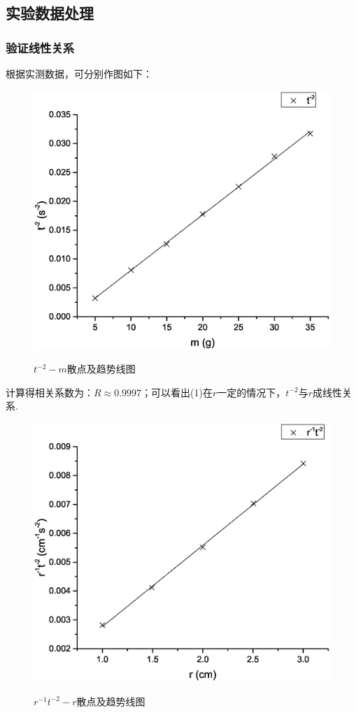 \documentclass{ctexart}
\begin{document}
      \subsection{实验数据处理}
      \subsubsection{验证线性关系}
      根据实测数据，可分别作图如下：
      \begin{figure}[H]
        \centering
        \caption{$t^{-2}-m$散点及趋势线图}
        \includegraphics[width=1.0\textwidth]{1}
        \label{fig:digit}
      \end{figure}
      计算得相关系数为：$R\approx0.9997$；可以看出(1)在$r$一定的情况下，$t^{-2}$与$r$成线性关系.
      \begin{figure}[H]
        \centering
        \caption{$r^{-1}t^{-2}-r$散点及趋势线图}
        \includegraphics[width=1.0\textwidth]{2}
        \label{fig:digit}
      \end{figure}
\end{document}

